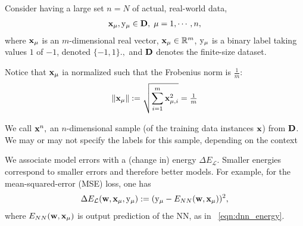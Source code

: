 Consider having a large set $n=N$ of actual, real-world data, 
\begin{align}
  \label{eqn:x}
  {\mathbf{x}}_{\mu}, \mathrm{y}_{\mu} \in\mathbf{D},\;\mu=1, \cdots, n,
\end{align}
where ${\mathbf{x}}_{\mu}$ is an $m$-dimensional real vector, ${\mathbf{x}}_{\mu}\in\mathbb{R}^{m}$,
$\mathrm{y}_{\mu}$ is a binary label taking values $1$ of $-1$, denoted $\{-1,1\}$.$, $
and $\mathbf{D}$ denotes the finite-size dataset.

  Notice that ${\mathbf{x}}_{\mu}$ ia normalized such that the Frobenius norm is $\tfrac{1}{m}$:
  \begin{equation}
    \label{eqn:XVEC_norm}
    \Vert{\mathbf{x}}_{\mu}\Vert := \sqrt{\sum_{i=1}^{m} {\mathbf{x}}_{\mu,i}^{2}}=\tfrac{1}{m}
  \end{equation}
  
We call ${\mathbf{x}}^{n},$ an $n$-dimensional sample (of the training data instances ${\mathbf{x}}$) from $\mathbf{D}$.  We may or may not specify the labels for this sample, depending on the context

We associate model errors
with a (change in) energy $\Delta E_{\mathcal{L}}$. Smaller energies correspond to smaller errors and therefore better models.
For example, for the mean-squared-error (MSE) loss, one has
\begin{align}
  \label{eqn:DEy}
  \Delta E_{\mathcal{L}}({\mathbf{w}},{\mathbf{x}}_{\mu},\mathrm{y}_{\mu}):= (\mathrm{y}_{\mu}-E_{NN}({\mathbf{w}},{\mathbf{x}}_{\mu}))^{2}  ,
\end{align}
where 
$E_{NN}({\mathbf{w}},{\mathbf{x}}_{\mu})$ is output prediction of the NN, as in \EQN~\ref{eqn:dnn_energy}.


